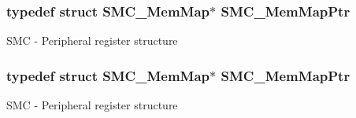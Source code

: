 \subsubsection[{\texorpdfstring{S\+M\+C\+\_\+\+Mem\+Map\+Ptr}{SMC_MemMapPtr}}]{\setlength{\rightskip}{0pt plus 5cm}typedef struct {\bf S\+M\+C\+\_\+\+Mem\+Map}$\ast$ {\bf S\+M\+C\+\_\+\+Mem\+Map\+Ptr}}\hypertarget{group___s_m_c___peripheral_ga763f87a6b8ebab7acb6dde639e6a47c7}{}\label{group___s_m_c___peripheral_ga763f87a6b8ebab7acb6dde639e6a47c7}
S\+MC -\/ Peripheral register structure 
\subsubsection[{\texorpdfstring{S\+M\+C\+\_\+\+Mem\+Map\+Ptr}{SMC_MemMapPtr}}]{\setlength{\rightskip}{0pt plus 5cm}typedef struct {\bf S\+M\+C\+\_\+\+Mem\+Map}$\ast$ {\bf S\+M\+C\+\_\+\+Mem\+Map\+Ptr}}\hypertarget{group___s_m_c___peripheral_ga763f87a6b8ebab7acb6dde639e6a47c7}{}\label{group___s_m_c___peripheral_ga763f87a6b8ebab7acb6dde639e6a47c7}
S\+MC -\/ Peripheral register structure 